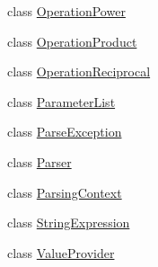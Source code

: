 \begin{DoxyCompactItemize}
\item 
class \hyperlink{class_b83_1_1_logic_expression_parser_1_1_operation_power}{Operation\+Power}
\item 
class \hyperlink{class_b83_1_1_logic_expression_parser_1_1_operation_product}{Operation\+Product}
\item 
class \hyperlink{class_b83_1_1_logic_expression_parser_1_1_operation_reciprocal}{Operation\+Reciprocal}
\item 
class \hyperlink{class_b83_1_1_logic_expression_parser_1_1_parameter_list}{Parameter\+List}
\item 
class \hyperlink{class_b83_1_1_logic_expression_parser_1_1_parse_exception}{Parse\+Exception}
\item 
class \hyperlink{class_b83_1_1_logic_expression_parser_1_1_parser}{Parser}
\item 
class \hyperlink{class_b83_1_1_logic_expression_parser_1_1_parsing_context}{Parsing\+Context}
\item 
class \hyperlink{class_b83_1_1_logic_expression_parser_1_1_string_expression}{String\+Expression}
\item 
class \hyperlink{class_b83_1_1_logic_expression_parser_1_1_value_provider}{Value\+Provider}
\end{DoxyCompactItemize}
